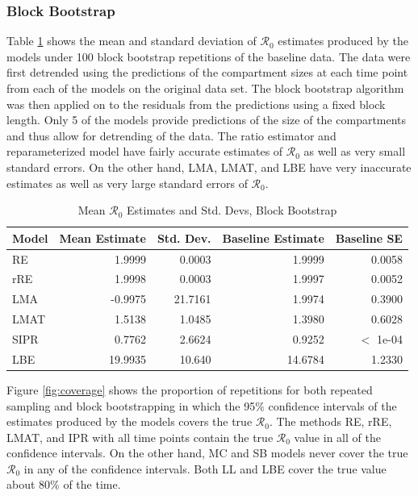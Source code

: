 \documentclass[12pt]{article}
\newcommand{\rr}{\ensuremath{\mathcal{R}_0}}
\begin{document}
\subsubsection{Block Bootstrap}

Table \ref{tab:bb-samp} shows the mean and standard deviation of $\rr$ estimates produced by the models under 100 block bootstrap repetitions of the baseline data. The data were first detrended using the predictions of the compartment sizes at each time point from each of the models on the original data set. The block bootstrap algorithm was then applied on to the residuals from the predictions using a fixed block length. Only 5 of the models provide predictions of the size of the compartments and thus allow for detrending of the data. The ratio estimator and reparameterized model have fairly accurate estimates of $\rr$ as well as very small standard errors. On the other hand, LMA, LMAT, and LBE  have very inaccurate estimates as well as very large standard errors of $\rr$.

\begin{table}[H]
	
	\centering
	\begin{tabular}[t]{l|r|r|r|r}
		\hline
		Model & Mean Estimate & Std. Dev. & Baseline Estimate & Baseline SE\\
		\hline
		RE & 1.9999 & 0.0003 & 1.9999 & 0.0058\\
		\hline
		rRE & 1.9998 & 0.0003 & 1.9997 & 0.0052\\
		\hline
		LMA & -0.9975 & 21.7161 & 1.9974 & 0.3900\\
		\hline
		LMAT & 1.5138 & 1.0485 & 1.3980 & 0.6028 \\
		\hline
		SIPR & 0.7762 & 2.6624 & 0.9252 & $<$ 1e-04 \\
		\hline
		LBE & 19.9935 & 10.640 & 14.6784 & 1.2330 \\
		\hline
	\end{tabular}
	\caption{Mean $\rr$ Estimates and Std. Devs, Block Bootstrap}
	\label{tab:bb-samp}
\end{table}

Figure \ref{fig:coverage} shows the proportion of repetitions for both repeated sampling and block bootstrapping in which the 95\% confidence intervals of the estimates produced by the models covers the true $\rr$. The methods RE, rRE, LMAT, and IPR with all time points contain the true $\rr$ value in all of the confidence intervals. On the other hand, MC and SB models never cover the true $\rr$ in any of the confidence intervals.  Both LL and LBE cover the true value about 80\% of the time.
\end{document}
